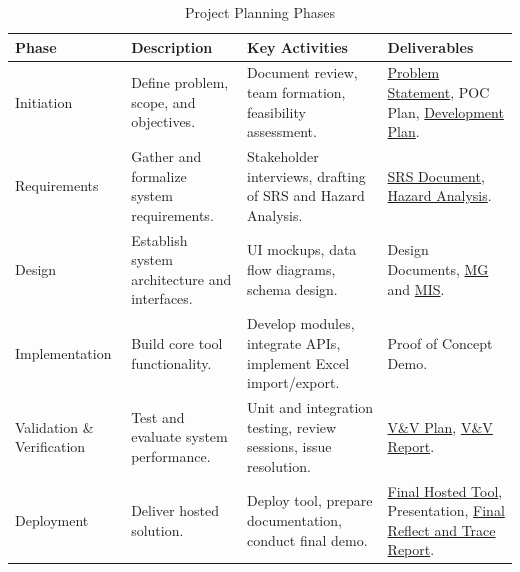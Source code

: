\documentclass[12pt]{article}
\begin{document}
\begin{table}[H]
\centering
\caption{Project Planning Phases}
\setlength{\tabcolsep}{4pt}
\renewcommand{\arraystretch}{1.2}
\footnotesize

\begin{tabularx}{\textwidth}{p{2.5cm} Y Y Y}
\toprule
\textbf{Phase} & \textbf{Description} & \textbf{Key Activities} & \textbf{Deliverables} \\
\midrule
{}
Initiation &
Define problem, scope, and objectives. &
Document review, team formation, feasibility assessment. &
\href{https://github.com/thaafei/DomainX/blob/main/docs/ProblemStatementAndGoals/ProblemStatement.pdf}{Problem Statement}, POC Plan, \href{https://github.com/thaafei/DomainX/blob/main/docs/DevelopmentPlan/DevelopmentPlan.pdf}{Development Plan}. \\
\hline
Requirements &
Gather and formalize system requirements. &
Stakeholder interviews, drafting of SRS and Hazard Analysis. &
\href{https://github.com/thaafei/DomainX/blob/main/docs/SRS/SRS.pdf}{SRS Document}, \href{https://github.com/thaafei/DomainX/blob/main/docs/HazardAnalysis/HazardAnalysis.pdf}{Hazard Analysis}. \\
\hline
Design &
Establish system architecture and interfaces. &
UI mockups, data flow diagrams, schema design. &
Design Documents, \href{https://github.com/thaafei/DomainX/blob/main/docs/Design/SoftArchitecture/MG.pdf}{MG} and \href{https://github.com/thaafei/DomainX/blob/main/docs/Design/SoftDetailedDes/MIS.pdf}{MIS}. \\
\hline
Implementation &
Build core tool functionality. &
Develop modules, integrate APIs, implement Excel import/export. &
Proof of Concept Demo. \\
\hline
Validation \& Verification &
Test and evaluate system performance. &
Unit and integration testing, review sessions, issue resolution. &
\href{https://github.com/thaafei/DomainX/blob/main/docs/VnVPlan/VnVPlan.pdf}{V\&V Plan}, \href{https://github.com/thaafei/DomainX/blob/main/docs/VnVReport/VnVReport.pdf}{V\&V Report}. \\
\hline
Deployment &
Deliver hosted solution. &
Deploy tool, prepare documentation, conduct final demo. &
\href{https://domainx.cas.mcmaster.ca/}{Final Hosted Tool}, Presentation, \href{https://github.com/thaafei/DomainX/blob/main/docs/ReflectAndTrace/ReflectAndTrace.pdf}{Final Reflect and Trace Report}. \\
\bottomrule
\end{tabularx}
\end{table}
\end{document}
